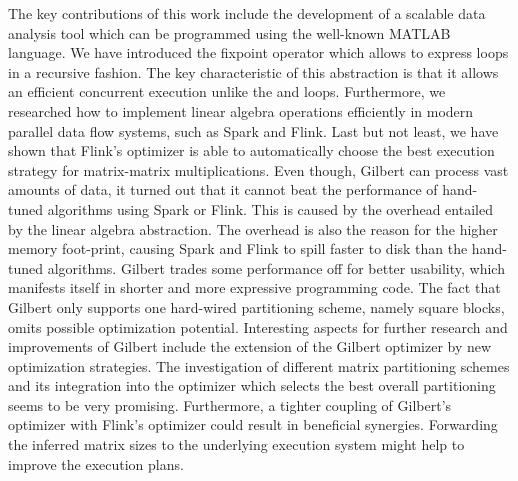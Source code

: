 The key contributions of this work include the development of a scalable data analysis tool which can be programmed using the well-known MATLAB language. We have introduced the fixpoint operator which allows to express loops in a recursive fashion. The key characteristic of this abstraction is that it allows an efficient concurrent execution unlike the  and  loops. Furthermore, we researched how to implement linear algebra operations efficiently in modern parallel data flow systems, such as Spark and Flink. Last but not least, we have shown that Flink's optimizer is able to automatically choose the best execution strategy for matrix-matrix multiplications. Even though, Gilbert can process vast amounts of data, it turned out that it cannot beat the performance of hand-tuned algorithms using Spark or Flink. This is caused by the overhead entailed by the linear algebra abstraction. The overhead is also the reason for the higher memory foot-print, causing Spark and Flink to spill faster to disk than the hand-tuned algorithms. Gilbert trades some performance off for better usability, which manifests itself in shorter and more expressive programming code. The fact that Gilbert only supports one hard-wired partitioning scheme, namely square blocks, omits possible optimization potential. Interesting aspects for further research and improvements of Gilbert include the extension of the Gilbert optimizer by new optimization strategies. The investigation of different matrix partitioning schemes and its integration into the optimizer which selects the best overall partitioning seems to be very promising. Furthermore, a tighter coupling of Gilbert's optimizer with Flink's optimizer could result in beneficial synergies. Forwarding the inferred matrix sizes to the underlying execution system might help to improve the execution plans.